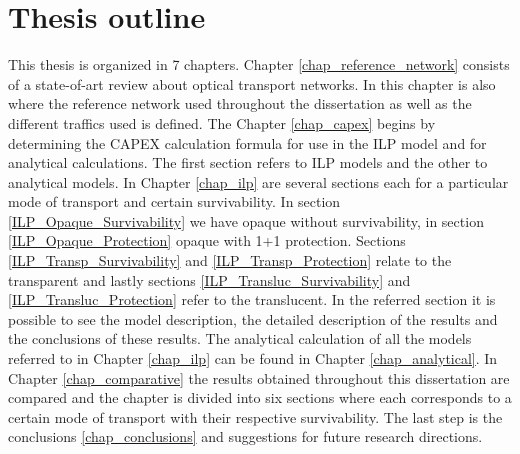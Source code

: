 \section{Thesis outline}
\label{outline}

This thesis is organized in 7 chapters. Chapter \ref{chap_reference_network} consists of a state-of-art review about optical transport networks. In this chapter is also where the reference network used throughout the dissertation as well as the different traffics used is defined. The Chapter \ref{chap_capex} begins by determining the CAPEX calculation formula for use in the ILP model and for analytical calculations. The first section refers to ILP models and the other to analytical models. In Chapter \ref{chap_ilp} are several sections each for a particular mode of transport and certain survivability. In section \ref{ILP_Opaque_Survivability} we have opaque without survivability, in section \ref{ILP_Opaque_Protection} opaque with 1+1 protection. Sections \ref{ILP_Transp_Survivability} and \ref{ILP_Transp_Protection} relate to the transparent and lastly sections \ref{ILP_Transluc_Survivability} and \ref{ILP_Transluc_Protection} refer to the translucent. In the referred section it is possible to see the model description, the detailed description of the results and the conclusions of these results. The analytical calculation of all the models referred to in Chapter \ref{chap_ilp} can be found in Chapter \ref{chap_analytical}. In Chapter \ref{chap_comparative} the results obtained throughout this dissertation are compared and the chapter is divided into six sections where each corresponds to a certain mode of transport with their respective survivability. The last step is the conclusions \ref{chap_conclusions} and suggestions for future research directions.

